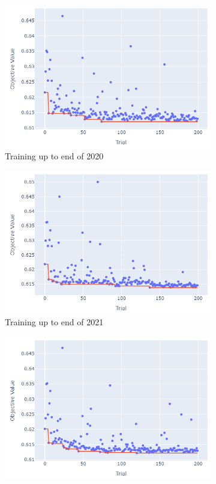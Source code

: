 \documentclass[12pt,twoside]{report}
\begin{document}
\begin{figure}[htb]
\begin{subfigure}{.33\linewidth}
  \includegraphics[width=0.95\linewidth]{figures/lightgbm_no_odds_cutoff_2020.png}
  \caption{Training up to end of 2020}
\end{subfigure}%
\begin{subfigure}{.33\linewidth}
  \centering
  \includegraphics[width=0.95\linewidth]{figures/lightgbm_no_odds_cutoff_2021.png}
  \caption{Training up to end of 2021}
\end{subfigure}
\par\bigskip
\par\bigskip
\begin{subfigure}{.33\linewidth}
  \centering
  \includegraphics[width=0.95\linewidth]{figures/lightgbm_no_odds_cutoff_2022.png}

\end{subfigure}
\end{figure}
\end{document}
